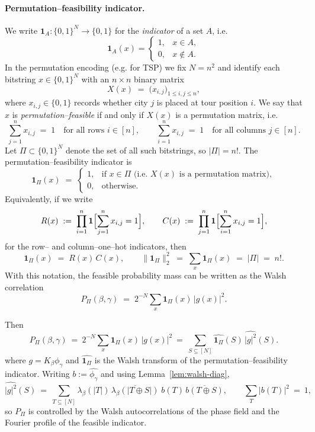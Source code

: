 \documentclass[a4paper,onecolumn,11pt,unpublished]{quantumarticle}
\theoremstyle{remark}
\begin{document}
\paragraph{Permutation–feasibility indicator.}
We write $\mathbf{1}_A:\{0,1\}^N\to\{0,1\}$ for the \emph{indicator} of a set $A$, i.e.
\[
  \mathbf{1}_A(x)=
  \begin{cases}
    1,& x\in A,\\
    0,& x\notin A.
  \end{cases}
\]
In the permutation encoding (e.g. for TSP) we fix $N=n^2$ and identify each bitstring
$x\in\{0,1\}^N$ with an $n\times n$ binary matrix
\[
  X(x)\;=\;\bigl(x_{i,j}\bigr)_{1\le i,j\le n},
\]
where $x_{i,j}\in\{0,1\}$ records whether city $j$ is placed at tour position $i$.
We say that $x$ is \emph{permutation–feasible} if and only if $X(x)$ is a
permutation matrix, i.e.
\[
  \sum_{j=1}^n x_{i,j} \;=\; 1\quad\text{for all rows }i\in[n],
  \qquad
  \sum_{i=1}^n x_{i,j} \;=\; 1\quad\text{for all columns }j\in[n].
\]
Let $\Pi\subset\{0,1\}^N$ denote the set of all such bitstrings, so
$|\Pi|=n!$. The permutation–feasibility indicator is
\[
  \mathbf{1}_\Pi(x)
  \;=\;
  \begin{cases}
    1, & \text{if }x\in\Pi\text{ (i.e.\ $X(x)$ is a permutation matrix)},\\[2pt]
    0, & \text{otherwise.}
  \end{cases}
\]
Equivalently, if we write
\[
  R(x)\;:=\;\prod_{i=1}^n \mathbf{1}\Bigl[\sum_{j=1}^n x_{i,j}=1\Bigr],
  \qquad
  C(x)\;:=\;\prod_{j=1}^n \mathbf{1}\Bigl[\sum_{i=1}^n x_{i,j}=1\Bigr],
\]
for the row– and column–one–hot indicators, then
\[
  \mathbf{1}_\Pi(x) \;=\; R(x)\,C(x),
  \qquad
  \|\mathbf{1}_\Pi\|_2^2 \;=\; \sum_{x}\mathbf{1}_\Pi(x) \;=\; |\Pi| \;=\; n!.
\]
With this notation, the feasible probability mass can be written as the Walsh correlation
\[
  P_\Pi(\beta,\gamma)
  \;=\; 2^{-N}\sum_{x}\mathbf{1}_\Pi(x)\,|g(x)|^2.
\]

Then
\[
  P_\Pi(\beta,\gamma)
  \ =\ 2^{-N}\sum_{x}\mathbf{1}_\Pi(x)\,|g(x)|^2
  \ =\ \sum_{S\subseteq[N]} \widehat{\mathbf{1}_\Pi}(S)\,\widehat{|g|^2}(S).
\]
where $g=K_\beta\phi_\gamma$ and $\widehat{\mathbf{1}_\Pi}$ is the Walsh transform
of the permutation–feasibility indicator. Writing $b:=\widehat{\phi_\gamma}$ and using Lemma~\ref{lem:walsh-diag},
\[
  \widehat{|g|^2}(S)
  \ =\ \sum_{T\subseteq[N]}\lambda_\beta(|T|)\,\overline{\lambda_\beta(|T\oplus S|)}\;
       b(T)\,\overline{b(T\oplus S)},
  \qquad
  \sum_{T}|b(T)|^2\ =\ 1,
\]
so $P_\Pi$ is controlled by the Walsh autocorrelations of the phase field and the Fourier profile of the feasible indicator.
\end{document}
